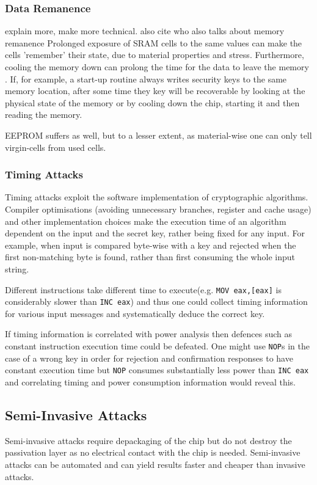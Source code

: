 	\subsubsection{Data Remanence}
	{\color{red} explain more, make more technical. also cite \citep{website:ibm_secure} who also talks about memory remanence}
	Prolonged exposure of SRAM cells to the same values can make the cells 'remember' their state, due to material properties and stress\citep{gutman:memory_remanence}. Furthermore, cooling the memory down can prolong the time for the data to leave the memory \citep{gutman:memory_remanence}\citep{sergei:RAM}\citep{sergei:thesis}. If, for example, a start-up routine always writes security keys to the same memory location, after some time they key will be recoverable by looking at the physical state of the memory or by cooling down the chip, starting it and then reading the memory.
	
	EEPROM suffers as well, but to a lesser extent, as material-wise one can only tell virgin-cells from used cells\citep{sergei:thesis}. 
	
	\subsubsection{Timing Attacks}
	Timing attacks exploit the software implementation of cryptographic algorithms. Compiler optimisations (avoiding unnecessary branches, register and cache usage) and other implementation choices make the execution time of an algorithm dependent on the input and the secret key, rather being fixed for any input. For example, when input is compared byte-wise with a key and rejected when the first non-matching byte is found, rather than first consuming the whole input string.
	
	Different instructions take different time to execute(e.g. \texttt{MOV eax,[eax]} is considerably slower than \texttt{INC eax}) and thus one could collect timing information for various input messages and systematically deduce the correct key. 
	
	If timing information is correlated with power analysis then defences such as constant instruction execution time could be defeated. One might use \texttt{NOP}s in the case of a wrong key in order for rejection and confirmation responses to have constant execution time but \texttt{NOP} consumes substantially less power than \texttt{INC eax} and correlating timing and power consumption information would reveal this.

	\subsection{Semi-Invasive Attacks}
	Semi-invasive attacks require depackaging of the chip but do not destroy the passivation layer as no electrical contact with the chip is needed. Semi-invasive attacks can be automated and can yield results faster and cheaper than invasive attacks.
	
